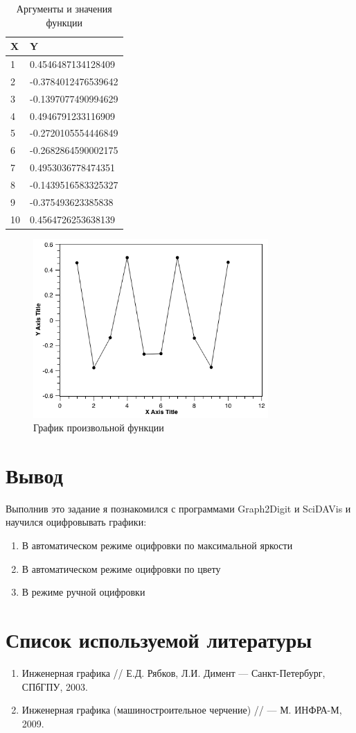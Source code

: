 \documentclass[a4paper,14pt,russian]{report}
\begin{document}
\begin{table}[!htb]
  \centering
  \caption{Аргументы и значения функции}
  \label{table:formula}
  \begin{tabular}{|l|l|}
    \hline
    X & Y \\
    \hline
    1 & 0.4546487134128409 \\
    2 & -0.3784012476539642 \\
    3 & -0.1397077490994629 \\
    4 & 0.4946791233116909 \\
    5 & -0.2720105554446849 \\
    6 & -0.2682864590002175 \\
    7 & 0.4953036778474351 \\
    8 & -0.1439516583325327 \\
    9 & -0.375493623385838 \\
    10 & 0.4564726253638139 \\
    \hline
  \end{tabular}
\end{table}


\begin{figure}[!htb]
  \centerline{\includegraphics[width=0.8\textwidth]{graph-formula}}
  \caption{График произвольной функции}
  \label{graph:formula}
\end{figure}

\section{Вывод}

Выполнив это задание я познакомился с программами Graph2Digit и SciDAVis и научился оцифровывать графики:

\begin{enumerate}
  \item В автоматическом режиме оцифровки по максимальной яркости
  \item В автоматическом режиме оцифровки по цвету
  \item В режиме ручной оцифровки
\end{enumerate}

\section{Список используемой литературы}

\begin{enumerate}
  \item Инженерная графика // Е.Д. Рябков, Л.И. Димент — Санкт-Петербург, СПбГПУ, 2003.
  \item Инженерная графика (машиностроительное черчение) // — М. ИНФРА-М, 2009.
\end{enumerate}
\end{document}
